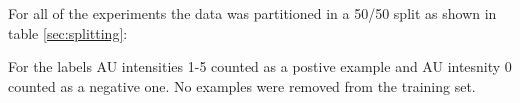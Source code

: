     For all of the experiments the data was partitioned in a 50/50 split as shown in table \ref{sec:splitting}:
    \begin{table}[h!]
    \end{table}

    For the labels AU intensities 1-5 counted as a postive example and AU intesnity 0 counted as a negative one.
    No examples were removed from the training set.


